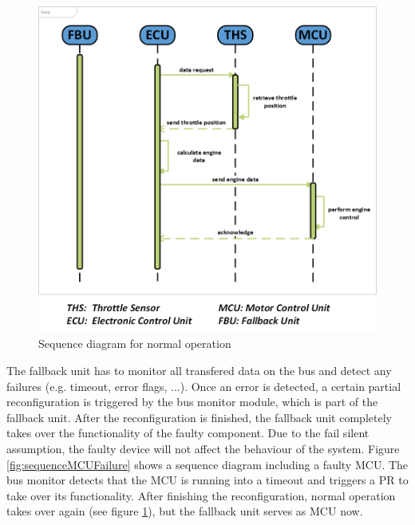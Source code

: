 \begin{figure}[h!]
    \centering
    \includegraphics[width=\textwidth]{figures/sequence_normal_op.png}
    \caption{Sequence diagram for normal operation}\label{fig:sequenceNormalOp}
\end{figure}

The fallback unit has to monitor all transfered data on the bus and detect any failures (e.g. timeout, error flags, ...). Once an error is detected, a certain partial reconfiguration is triggered by the bus monitor module, which is part of the fallback unit. After the reconfiguration is finished, the fallback unit completely takes over the functionality of the faulty component. Due to the fail silent assumption, the faulty device will not affect the behaviour of the system. Figure \ref{fig:sequenceMCUFailure} shows a sequence diagram including a faulty \gls{MCU}. The bus monitor detects that the \gls{MCU} is running into a timeout and triggers a \gls{PR} to take over its functionality. After finishing the reconfiguration, normal operation takes over again (see figure \ref{fig:sequenceNormalOp}), but the fallback unit serves as \gls{MCU} now.

